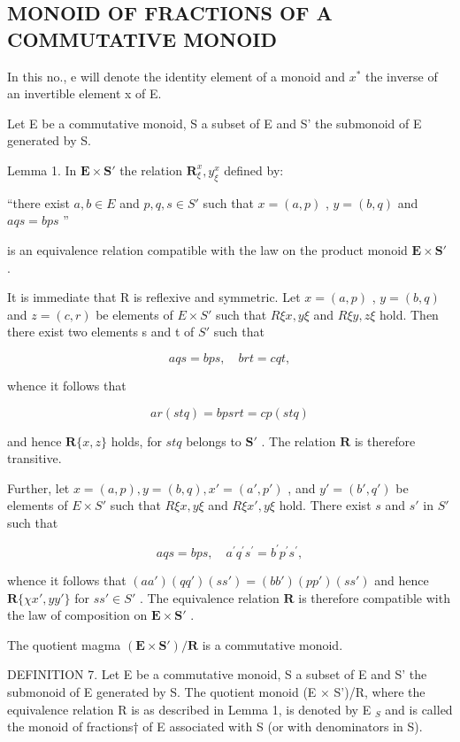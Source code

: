 \subsection{MONOID OF FRACTIONS OF A COMMUTATIVE MONOID}

In this no., e will denote the identity element of a monoid and \(x^{*}\) the inverse of an invertible element x of E.

Let E be a commutative monoid, S a subset of E and S' the submonoid of E generated by S.

Lemma 1. In \(\mathbf{E} \times \mathbf{S}'\) the relation \(\mathbf{R}_{\xi}^{x}, y_{\xi}^{x}\) defined by:

``there exist \(a, b \in E\) and \(p, q, s \in S'\) such that \(x = (a, p)\) , \(y = (b, q)\) and \(aqs = bps\) ''

is an equivalence relation compatible with the law on the product monoid \(\mathbf{E} \times \mathbf{S}'\) .

It is immediate that R is reflexive and symmetric. Let \(x = (a, p)\) , \(y = (b, q)\) and \(z = (c, r)\) be elements of \(E \times S'\) such that \(R\xi x, y\xi\) and \(R\xi y, z\xi\) hold. Then there exist two elements s and t of \(S'\) such that

\[
a q s = b p s, \quad b r t = c q t,
\]

whence it follows that

\[
a r (s t q) = b p s r t = c p (s t q)
\]

and hence \(\mathbf{R}\{x, z\}\) holds, for \(stq\) belongs to \(\mathbf{S}'\) . The relation \(\mathbf{R}\) is therefore transitive.

Further, let \(x = (a, p), y = (b, q), x' = (a', p')\) , and \(y' = (b', q')\) be elements of \(E \times S'\) such that \(R\xi x, y\xi\) and \(R\xi x', y\xi\) hold. There exist \(s\) and \(s'\) in \(S'\) such that

\[
a q s = b p s, \quad a ^ {\prime} q ^ {\prime} s ^ {\prime} = b ^ {\prime} p ^ {\prime} s ^ {\prime},
\]

whence it follows that \((aa')(qq')(ss') = (bb')(pp')(ss')\) and hence \(\mathbf{R}\{\chi x', yy'\}\) for \(ss' \in S'\) . The equivalence relation \(\mathbf{R}\) is therefore compatible with the law of composition on \(\mathbf{E} \times \mathbf{S}'\) .

The quotient magma \((\mathbf{E} \times \mathbf{S}')/\mathbf{R}\) is a commutative monoid.

DEFINITION 7. Let E be a commutative monoid, S a subset of E and S' the submonoid of E generated by S. The quotient monoid (E × S')/R, where the equivalence relation R is as described in Lemma 1, is denoted by E \(_{S}\) and is called the monoid of fractions† of E associated with S (or with denominators in S).

